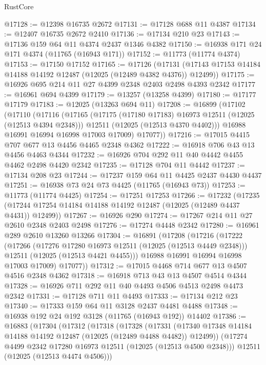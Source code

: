\begin{lexlean}{RustCore}
\begin{coremodule}
@17128 := @12398 @16735 @2672
@17131 := @17128 @688 @11 @4387
@17134 := @12407 @16735 @2672 @2410
@17136 := @17134 @210 @23
@17143 := @17136 @159 @64 @11 @4374 @2437 @1346 @4382
@17150 := @16938 @171 @24 @171 @4374 (@11765 (@16943 @171))
@17152 := @11773 (@11774 @4374)
@17153 := @17150 @17152
@17165 := @17126
    (@17131 (@17143 @17153 @14184 @14188 @14192 @12487 (@12025 (@12489 @4382 @4376)) @12499))
@17175 := @16926 @695 @214 @11 @27 @4399 @2348 @2403 @2498 @4393 @2342
@17177 := @16961 @694 @4399
@17179 := @13257 (@13258 @4399)
@17180 := @17177 @17179
@17183 := @12025 (@13263 @694 @11)
@17208 := @16899
    (@17102
      (@17110
        (@17116
          (@17165
            (@17175 (@17180 @17183) @16973 @12511 (@12025 (@12513 @4394 @2348)))
            @12511
            (@12025 (@12513 @4370 @4402)))
          @16988
          @16991
          @16994
          @16998
          @17003
          @17009)
        @17077))
@17216 := @17015 @4415 @707 @677 @13 @4456 @4465 @2348 @4362
@17222 := @16918 @706 @43 @13 @4456 @4463 @4344
@17232 := @16926 @704 @292 @11 @40 @4442 @4455 @4462 @2498 @4420 @2342
@17235 := @17128 @704 @11 @4442
@17237 := @17134 @208 @23
@17244 := @17237 @159 @64 @11 @4425 @2437 @4430 @4437
@17251 := @16938 @73 @24 @73 @4425 (@11765 (@16943 @73))
@17253 := @11773 (@11774 @4425)
@17254 := @17251 @17253
@17266 := @17232
    (@17235 (@17244 @17254 @14184 @14188 @14192 @12487 (@12025 (@12489 @4437 @4431)) @12499))
@17267 := @16926 @290
@17274 := @17267 @214 @11 @27 @2610 @2348 @2403 @2498
@17276 := @17274 @4448 @2342
@17280 := @16961 @289 @2610 @13260 @13266
@17304 := @16891
    (@17208
      (@17216
        (@17222
          (@17266
            (@17276 @17280 @16973 @12511 (@12025 (@12513 @4449 @2348)))
            @12511
            (@12025 (@12513 @4421 @4455)))
          @16988
          @16991
          @16994
          @16998
          @17003
          @17009)
        @17077))
@17312 := @17015 @4468 @714 @677 @13 @4507 @4516 @2348 @4362
@17318 := @16918 @713 @43 @13 @4507 @4514 @4344
@17328 := @16926 @711 @292 @11 @40 @4493 @4506 @4513 @2498 @4473 @2342
@17331 := @17128 @711 @11 @4493
@17333 := @17134 @212 @23
@17340 := @17333 @159 @64 @11 @3128 @2437 @4481 @4488
@17348 := @16938 @192 @24 @192 @3128 (@11765 (@16943 @192)) @14402
@17386 := @16883
    (@17304
      (@17312
        (@17318
          (@17328
            (@17331
              (@17340 @17348 @14184 @14188 @14192 @12487 (@12025 (@12489 @4488 @4482)) @12499))
            (@17274 @4499 @2342 @17280 @16973 @12511 (@12025 (@12513 @4500 @2348)))
            @12511
            (@12025 (@12513 @4474 @4506)))

\end{coremodule}
\end{lexlean}
